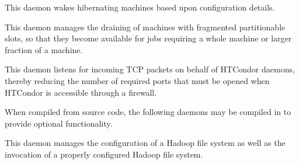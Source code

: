 \begin{description}
\item[\Condor{rooster}] This daemon wakes hibernating machines based
upon configuration details.

\item[\Condor{defrag}] This daemon manages the draining of machines
with fragmented partitionable slots, so that they become available
for jobs requiring a whole machine or larger fraction of a machine.

\item[\Condor{shared\_port}] This daemon listens for incoming TCP packets
on behalf of HTCondor daemons, thereby reducing the number of required
ports that must be opened when HTCondor is accessible through a firewall. 

\end{description} 

When compiled from source code,
the following daemons may be compiled in to provide optional functionality.
\begin{description} 

\item[\Condor{hdfs}] This daemon manages the configuration of a
Hadoop file system as well as the invocation of a properly configured
Hadoop file system.

\end{description} 



